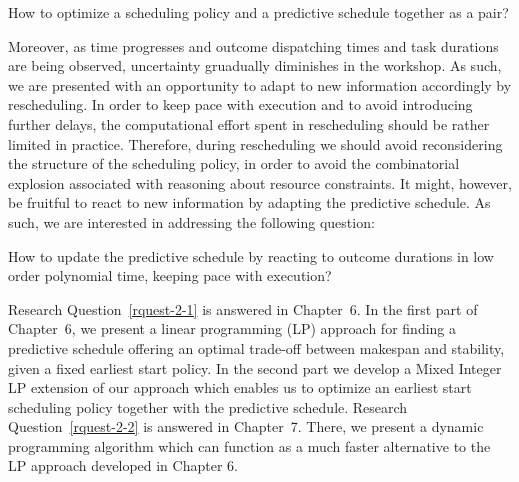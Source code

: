 		\begin{rquest}
			\label{rquest-2-1}
			How to optimize a scheduling policy and a predictive schedule together as a pair?
		\end{rquest}

	Moreover, as time progresses and outcome dispatching times and task durations are being observed, 
	uncertainty gruadually diminishes in the workshop.
	As such, we are presented with an opportunity to adapt to new information accordingly by rescheduling.
	In order to keep pace with execution and to avoid introducing further delays,
	the computational effort spent in rescheduling should be rather limited in practice. 
	Therefore, during rescheduling we should avoid reconsidering the structure of the scheduling policy,
	in order to avoid the combinatorial explosion associated with reasoning about resource constraints.
	It might, however, be fruitful to react to new information by adapting the predictive schedule.
	As such, we are interested in addressing the following question:

		\begin{rquest} 
			\label{rquest-2-2}
			How to update the predictive schedule by reacting to outcome durations in low order polynomial time, keeping pace with execution?
		\end{rquest}

	Research Question~\ref{rquest-2-1} is answered in Chapter~6.
	In the first part of Chapter~6, we present a linear programming (LP) approach for finding a predictive schedule offering an optimal 
	trade-off between makespan and stability, given a fixed earliest start policy.
	In the second part we develop a Mixed Integer LP extension of our approach which enables 
	us to optimize an earliest start scheduling policy together with the predictive schedule.
	Research Question~\ref{rquest-2-2} is answered in Chapter~7.
	There, we present a dynamic programming algorithm which can function as a much faster alternative to the LP approach developed in Chapter 6.

